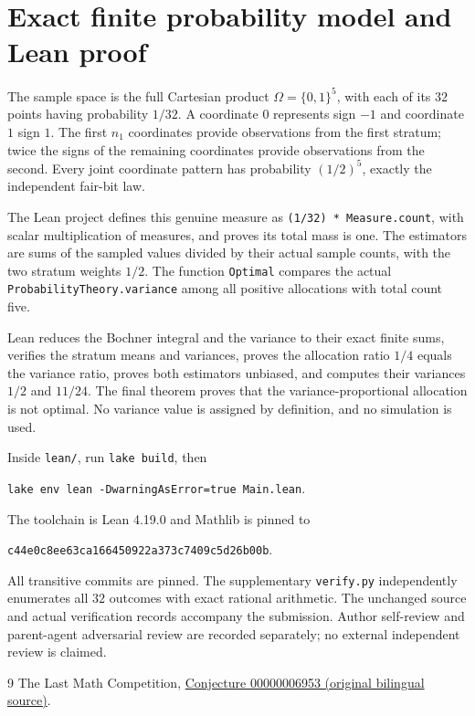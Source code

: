 \documentclass[11pt]{article}
\begin{document}
\section*{Exact finite probability model and Lean proof}
The sample space is the full Cartesian product $\Omega=\{0,1\}^5$, with each of its $32$ points having probability $1/32$. A coordinate $0$ represents sign $-1$ and coordinate $1$ sign $1$. The first $n_1$ coordinates provide observations from the first stratum; twice the signs of the remaining coordinates provide observations from the second. Every joint coordinate pattern has probability $(1/2)^5$, exactly the independent fair-bit law.

The Lean project defines this genuine measure as \texttt{(1/32) * Measure.count}, with scalar multiplication of measures, and proves its total mass is one. The estimators are sums of the sampled values divided by their actual sample counts, with the two stratum weights $1/2$. The function \texttt{Optimal} compares the actual \texttt{ProbabilityTheory.variance} among all positive allocations with total count five.

Lean reduces the Bochner integral and the variance to their exact finite sums, verifies the stratum means and variances, proves the allocation ratio $1/4$ equals the variance ratio, proves both estimators unbiased, and computes their variances $1/2$ and $11/24$. The final theorem proves that the variance-proportional allocation is not optimal. No variance value is assigned by definition, and no simulation is used.

Inside \texttt{lean/}, run \texttt{lake build}, then
\begin{center}\texttt{lake env lean -DwarningAsError=true Main.lean}.\end{center}
The toolchain is Lean 4.19.0 and Mathlib is pinned to
\begin{center}\small\texttt{c44e0c8ee63ca166450922a373c7409c5d26b00b}.\end{center}
All transitive commits are pinned. The supplementary \texttt{verify.py} independently enumerates all $32$ outcomes with exact rational arithmetic. The unchanged source and actual verification records accompany the submission. Author self-review and parent-agent adversarial review are recorded separately; no external independent review is claimed.

\begin{thebibliography}{9}
 The Last Math Competition,
\href{https://github.com/The-Last-Math-Competition/The-Last-Math-Competition/blob/main/conjectures/00000006953.md}{Conjecture 00000006953 (original bilingual source)}.
\end{thebibliography}
\end{document}
